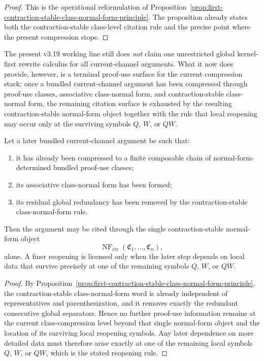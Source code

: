 \begin{proof}
This is the operational reformulation of Proposition~\ref{prop:first-contraction-stable-class-normal-form-principle}. The proposition already states both the contraction-stable class-level citation rule and the precise point where the present compression stops.
\end{proof}


\begin{remark}
\label{rem:status-of-the-terminal-proof-use-surface-in-the-present-v319-line}
The present v3.19 working line still does \emph{not} claim one unrestricted global kernel-first rewrite calculus for all current-channel arguments. What it now does provide, however, is a terminal proof-use surface for the current compression stack: once a bundled current-channel argument has been compressed through proof-use classes, associative class-normal form, and contraction-stable class-normal form, the remaining citation surface is exhausted by the resulting contraction-stable normal-form object together with the rule that local reopening may occur only at the surviving symbols $Q$, $W$, or $QW$.
\end{remark}

\begin{proposition}
\label{prop:terminal-citation-rule-for-the-present-v319-compression-line}
Let a later bundled current-channel argument be such that:
\begin{enumerate}[leftmargin=2em,label=(\roman*)]
\item it has already been compressed to a finite composable chain of normal-form-determined bundled proof-use classes;
\item its associative class-normal form has been formed;
\item its residual global redundancy has been removed by the contraction-stable class-normal-form rule.
\end{enumerate}
Then the argument may be cited through the single contraction-stable normal-form object
\[
\operatorname{NF}_{\mathrm{ctr}}(\mathfrak C_1,\dots,\mathfrak C_n),
\]
alone. A finer reopening is licensed only when the later step depends on local data that survive precisely at one of the remaining symbols $Q$, $W$, or $QW$.
\end{proposition}

\begin{proof}
By Proposition~\ref{prop:first-contraction-stable-class-normal-form-principle}, the contraction-stable class-normal-form word is already independent of representatives and parenthesization, and it removes exactly the redundant consecutive global separators. Hence no further proof-use information remains at the current class-compression level beyond that single normal-form object and the location of its surviving local reopening symbols. Any later dependence on more detailed data must therefore arise exactly at one of the remaining local symbols $Q$, $W$, or $QW$, which is the stated reopening rule.
\end{proof}

